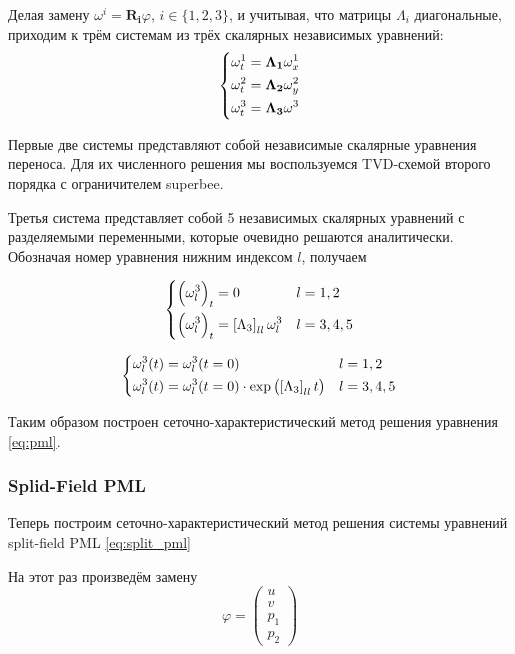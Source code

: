 Делая замену $\omega^i = \bm{R_i}\varphi $, $i\in\{1,2,3\}$, и учитывая, что матрицы $\Lambda_i$ диагональные, приходим к трём системам из трёх скалярных независимых уравнений:
\begin{equation}
\begin{dcases}
    \omega^1_t = \bm{\Lambda_1} \omega^1_x \\
	\omega^2_t = \bm{\Lambda_2} \omega^2_y \\
	\omega^3_t = \bm{\Lambda_3} \omega^3
\end{dcases}
\label{eq:pml_grid_char_sys}
\end{equation}

Первые две системы представляют собой независимые скалярные уравнения переноса. Для их численного решения мы  воспользуемся TVD-схемой второго порядка с ограничителем superbee.
    
Третья система представляет собой 5 независимых скалярных уравнений с разделяемыми переменными, которые очевидно решаются аналитически. Обозначая номер уравнения нижним индексом $l$, получаем

\begin{equation*}
\begin{dcases}
    \left(\omega^3_l\right)_t = 0 & l=1,2\\
    \left(\omega^3_l\right)_t = \left[\Lambda_3\right]_{ll} \omega^3_l & l=3,4,5
\end{dcases}
\end{equation*}

\begin{equation*}
\begin{dcases}
    \omega^3_l(t) = \omega^3_l(t=0) & l=1,2 \\
    \omega^3_l(t) = \omega^3_l(t=0) \cdot \exp\left(\left[\Lambda_3\right]_{ll} t\right) & l = 3,4,5
\end{dcases}
\end{equation*}

Таким образом построен сеточно-характеристический метод решения уравнения \eqref{eq:pml}.

\subsubsection{Splid-Field PML}

Теперь построим сеточно-характеристический метод решения системы уравнений split-field PML \eqref{eq:split_pml}

На этот раз произведём замену
\begin{equation}
	\varphi = \begin{pmatrix} u \\ v \\ p_1 \\ p_2 \end{pmatrix}
\end{equation}

